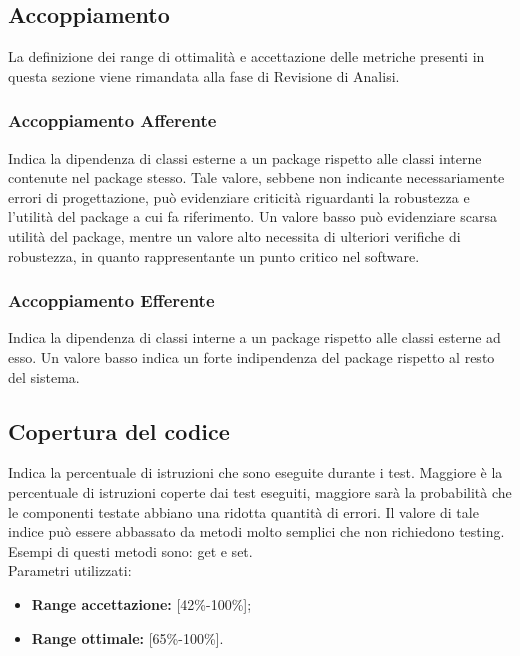 \subsection{Accoppiamento}
La definizione dei range di ottimalità e accettazione delle metriche presenti in questa sezione viene rimandata alla fase di Revisione di Analisi.
\subsubsection{Accoppiamento Afferente}
Indica la dipendenza di classi esterne a un package rispetto alle classi interne contenute nel package stesso.
Tale valore, sebbene non indicante necessariamente errori di progettazione, può evidenziare criticità riguardanti la robustezza e l'utilità del package a cui fa riferimento.
Un valore basso può evidenziare scarsa utilità del package, mentre un valore alto necessita di ulteriori verifiche di robustezza, in quanto rappresentante un punto critico nel software.
\subsubsection{Accoppiamento Efferente}
Indica la dipendenza di classi interne a un package rispetto alle classi esterne ad esso.
Un valore basso indica un forte indipendenza del package rispetto al resto del sistema.

\subsection{Copertura del codice}
Indica la percentuale di istruzioni che sono eseguite durante i test.
Maggiore è la percentuale di istruzioni coperte dai test eseguiti, maggiore sarà la probabilità che le componenti testate abbiano una ridotta quantità di errori.
Il valore di tale indice può essere abbassato da metodi molto semplici che non richiedono testing. Esempi di questi metodi sono: get e set.\\
Parametri utilizzati:

\begin{itemize}
	
	\item \textbf{Range accettazione:} [42\%-100\%];
	\item \textbf{Range ottimale:} [65\%-100\%].
	
\end{itemize}

